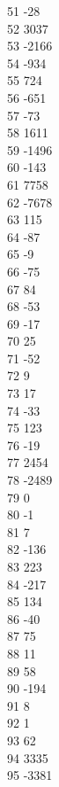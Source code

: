 { 51	-28 \\
 52	3037 \\
 53	-2166 \\
 54	-934 \\
 55	724 \\
 56	-651 \\
 57	-73 \\
 58	1611 \\
 59	-1496 \\
 60	-143 \\
 61	7758 \\
 62	-7678 \\
 63	115 \\
 64	-87 \\
 65	-9 \\
 66	-75 \\
 67	84 \\
 68	-53 \\
 69	-17 \\
 70	25 \\
 71	-52 \\
 72	9 \\
 73	17 \\
 74	-33 \\
 75	123 \\
 76	-19 \\
 77	2454 \\
 78	-2489 \\
 79	0 \\
 80	-1 \\
 81	7 \\
 82	-136 \\
 83	223 \\
 84	-217 \\
 85	134 \\
 86	-40 \\
 87	75 \\
 88	11 \\
 89	58 \\
 90	-194 \\
 91	8 \\
 92	1 \\
 93	62 \\
 94	3335 \\
 95	-3381 \\
}
